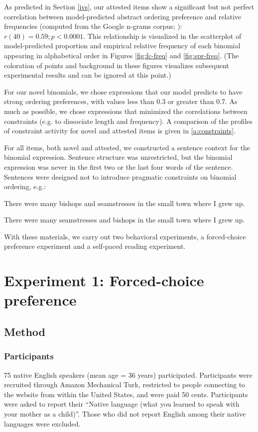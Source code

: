 \documentclass[authoryear]{elsarticle}
\begin{document}
As predicted in Section \ref{ivs}, our attested items show a significant but not perfect correlation between model-predicted abstract ordering preference and relative frequencies (computed from the Google n-grams corpus; \citealp{WebTgramVersio:tv}): $r(40)=0.59; p<0.0001$. This relationship is visualized in the scatterplot of model-predicted proportion and empirical relative frequency of each binomial appearing in alphabetical order in Figures \ref{fig:fc-freq} and \ref{fig:spr-freq}. (The coloration of points and background in these figures visualizes subsequent experimental results and can be ignored at this point.)

For our novel binomials, we chose expressions that our model predicts to have strong ordering preferences, with values less than 0.3 or greater than 0.7. As much as possible, we chose expressions that minimized the correlations between constraints (e.g. to dissociate length and frequency). A comparison of the profiles of constraint activity for novel and attested items is given in \ref{a:constraints}.


For all items, both novel and attested, we constructed a sentence context for the binomial expression. Sentence structure was unrestricted, but the binomial expression was never in the first two or the last four words of the sentence. Sentences were designed not to introduce pragmatic constraints on binomial ordering, e.g.:
\begin{exe}
\item There were many bishops and seamstresses in the small town where I grew up.
\item There were many seamstresses and bishops in the small town where I grew up.
\end{exe}

With these materials, we carry out two behavioral experiments, a forced-choice preference experiment and a self-paced reading experiment.


\section{Experiment 1: Forced-choice preference}\label{expt1}
\subsection{Method}
\subsubsection{Participants}
75 native English speakers (mean age = 36 years) participated. Participants were recruited through Amazon Mechanical Turk, restricted to people connecting to the website from within the United States, and were paid 50 cents. Participants were asked to report their ``Native language (what you learned to speak with your mother as a child)''. Those who did not report English among their native languages were excluded.
\end{document}
